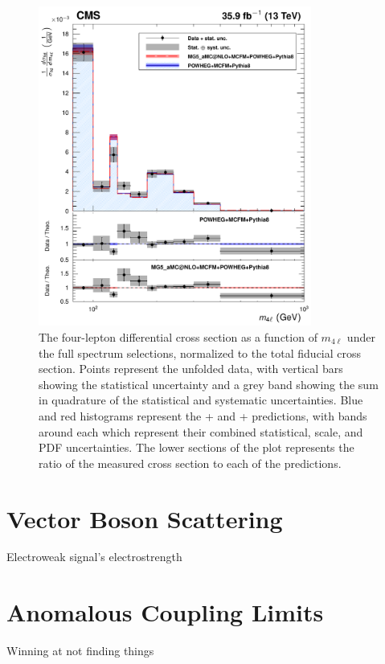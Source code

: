 \begin{figure}[htbp]
  \begin{center}
    \includegraphics[width=0.8\textwidth]{results/unfold_massFull.pdf}
    \caption[Normalized differential four-lepton cross section as a function of four-lepton invariant mass with loosened {\PZ} mass cuts]{
        The four-lepton differential cross section as a function of $m_{4\ell}$ under the full spectrum selections, normalized to the total fiducial cross section.
        Points represent the unfolded data, with vertical bars showing the statistical uncertainty and a grey band showing the sum in quadrature of the statistical and systematic uncertainties.
        Blue and red histograms represent the {\POWHEG}+{\MCFM} and {\MGAMC}+{\MCFM} predictions, with bands around each which represent their combined statistical, scale, and PDF uncertainties.
        The lower sections of the plot represents the ratio of the measured cross section to each of the predictions.
      }\label{fig:unfold_massFull}
  \end{center}
\end{figure}



\section{Vector Boson Scattering}
Electroweak signal's electrostrength



\section{Anomalous Coupling Limits}
Winning at not finding things

